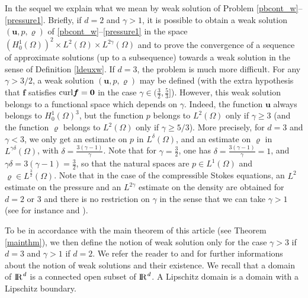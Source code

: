 \documentclass{amsart}
\numberwithin{equation}{section}
\begin{document}
In the sequel we explain what we mean by weak solution of Problem \eqref{pbcont_w}--\eqref{pressure1}.
Briefly, if $d=2$ and $\gamma >1$, it is possible to obtain a weak solution $({{\boldsymbol u}},p,{\varrho})$ of \eqref{pbcont_w}--\eqref{pressure1} in the space $(H^1_0(\Omega))^2 \times L^2(\Omega) \times L^{2 \gamma}(\Omega)$ and to prove the convergence of a sequence of approximate
solutions (up to a subsequence) towards  a weak solution in the sense of  Definition \ref{ldeuxw}. If $d=3$, the problem is much more difficult.
For any $\gamma > 3/2$, a weak solution $({{\boldsymbol u}},p,{\varrho})$ may be defined (with the extra hypothesis that $\bm{f}$ satisfies $ {{\rm curl}} \bm{f} = \bm{0}$ in the case $ \gamma \in (\frac{3}{2},\frac{5}{3}] $). 
However, this weak solution  belongs to a functional space which depends on $\gamma$.
Indeed, the function ${{\boldsymbol u}}$ always belongs to $H^1_0(\Omega)^3$, but the function $p$  belongs to $L^2(\Omega)$ only if
$\gamma \ge 3$ (and the function ${\varrho}$  belongs to $L^2(\Omega)$ only if $\gamma \ge 5/3$).  More precisely, for $d=3$ and $\gamma  <3$, we only get an estimate on $p$ in  $ L^{\delta}(\Omega)$, and an estimate on ${\varrho}$ in $L^{\gamma\delta}(\Omega)$, with $\delta=\frac{3(\gamma-1)}{\gamma}$.
Note that for $\gamma=\frac 3 2$, one has ${\delta}=\frac{3(\gamma-1)}{\gamma}=1$, and    $\gamma \delta = 3(\gamma-1)=\frac 3 2$, so that the natural spaces are $ p \in L^{1}(\Omega)$ and ${\varrho} \in  L^{\frac 3 2}(\Omega)$. Note that in the case of the compressible Stokes equations, an  $L^{2}$ estimate on the pressure and an $L^{2\gamma}$ estimate on the density are obtained for $d=2$ or $3$ and there is no restriction on $\gamma$ in the sense that we can take $\gamma>1$ (see for instance  \cite{eymard2010convergent} and \cite{eymard2010convergence}).

To be in accordance with the main theorem of this article (see Theorem \ref{mainthm}), we then define the notion of weak solution only  for the case $ \gamma > 3 $ if $d=3$ and $ \gamma >1 $ if $d=2$.
We refer the reader to \cite{novo2002existence} and \cite{straskraba2004introduction} for further informations about the notion of weak solutions and their existence. 
We recall that a domain of ${\ifmmode{\rm	I\mkern-3.1mu
R\mkern1mu}\else{\rm I\kern-.18em 
R\hskip1pt\	}\fi\relax}^d$ is a connected open subset of ${\ifmmode{\rm	I\mkern-3.1mu
R\mkern1mu}\else{\rm I\kern-.18em 
R\hskip1pt\	}\fi\relax}^d$. A Lipschitz domain is a domain with a Lipschitz boundary.
\end{document}
